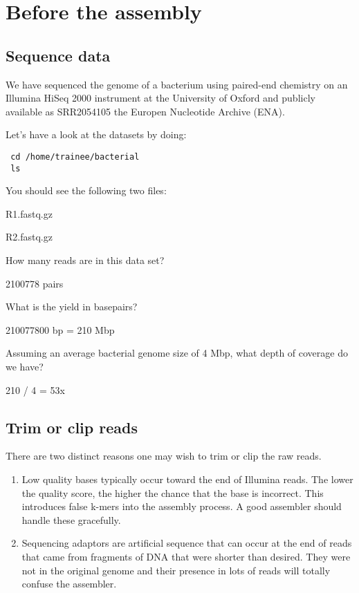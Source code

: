 
\section{Before the assembly}
\subsection{Sequence data}
We have sequenced the genome of a bacterium using paired-end chemistry on
an Illumina HiSeq 2000 instrument at the University of Oxford
and publicly available as SRR2054105 the Europen Nucleotide Archive (ENA).

\begin{steps}
Let's have a look at the datasets by doing:
\begin{lstlisting}
 cd /home/trainee/bacterial
 ls
\end{lstlisting}
You should see the following two files:
 \item R1.fastq.gz
 \item R2.fastq.gz
\end{steps}

\begin{questions}
How many reads are in this data set? \\
\begin{answer}
2100778 pairs
\end{answer}
What is the yield in basepairs? \\
\begin{answer}
210077800 bp = 210 Mbp
\end{answer}
Assuming an average bacterial genome size of 4 Mbp, what depth of coverage do we have? \\
\begin{answer}
210 / 4 = 53x
\end{answer}
\end{questions}

\subsection{Trim or clip reads}

There are two distinct reasons one may wish to trim or clip the raw reads.
\begin{enumerate}
\item Low quality bases typically occur toward the end of Illumina reads.
The lower the quality score, the higher the chance that the base is incorrect.
This introduces false k-mers into the assembly process. A good assembler
should handle these gracefully.
\item Sequencing adaptors are artificial sequence that can occur at the end of
reads that came from fragments of DNA that were shorter than desired.
They were not in the original genome and their presence in lots of reads
will totally confuse the assembler.
\end{enumerate}

